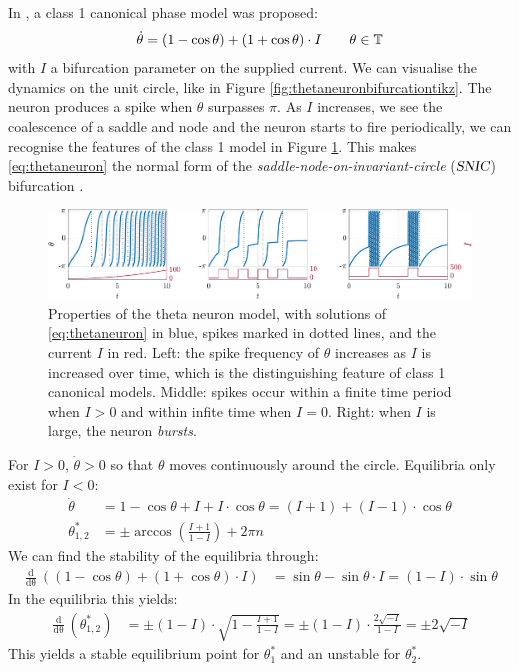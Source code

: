 In \cite{Ermentrout1986}, a class 1 canonical phase model was proposed:
\begin{align}
\dot{\theta} = (1-\cos \theta)+(1+\cos \theta) \cdot I \qquad \theta \in {\mathbb{T}} \label{eq:thetaneuron}
\end{align}
with $I$ a bifurcation parameter on the supplied current. We can visualise the dynamics on the unit circle, like in Figure \ref{fig:thetaneuronbifurcationtikz}. The neuron produces a spike when $\theta$ surpasses $\pi$. As $I$ increases, we see the coalescence of a saddle and node and the neuron starts to fire periodically, we can recognise the features of the class 1 model in Figure \ref{fig:ThetaNeuronResponseToCurrent}. This makes \eqref{eq:thetaneuron} the normal form of the \textit{saddle-node-on-invariant-circle} (${\textsl{SNIC}}$) bifurcation \cite{Luke2013}.

\begin{figure}[H]
\centering
\includegraphics[width = \textwidth]{../Figures/ThetaNeuronResponseToCurrent.pdf}
\caption{Properties of the theta neuron model, with solutions of \eqref{eq:thetaneuron} in blue, spikes marked in dotted lines, and the current $I$ in red. Left: the spike frequency of $\theta$ increases as $I$ is increased over time, which is the distinguishing feature of class 1 canonical models. Middle: spikes occur within a finite time period when $I > 0$ and within infite time when $I = 0$. Right: when $I$ is large, the neuron \textsl{bursts}.}
\label{fig:ThetaNeuronResponseToCurrent}
\end{figure}

For $I > 0$, $\dot{\theta} > 0$ so that $\theta$ moves continuously around the circle. Equilibria only exist for $I < 0$: 
\begin{align*}
\dot{\theta} &= 1-\cos \theta+I+I \cdot \cos \theta = (I+1)+(I-1) \cdot \cos \theta \\
\theta^{\ast}_{1, 2} &= \pm \arccos \left(\frac{I+1}{1-I}\right)+2 \pi n
\end{align*}
We can find the stability of the equilibria through:
\begin{align*}
\frac{\mathop{d}}{\mathop{d \theta}}((1-\cos \theta)+(1+\cos \theta) \cdot I) &= \sin \theta-\sin \theta \cdot I = (1-I) \cdot \sin \theta
\end{align*}
In the equilibria this yields:
\begin{align*}
\frac{\mathop{d}}{\mathop{d \theta}}\left( \theta^{\ast}_{1, 2} \right) &= \pm(1-I) \cdot \sqrt{1-\frac{I+1}{1-I}}=\pm(1-I) \cdot \frac{2 \sqrt{-I}}{1-I} = \pm2 \sqrt{-I}
\end{align*}
This yields a stable equilibrium point for $\theta^{\ast}_{1}$ and an unstable for $\theta^{\ast}_{2}$.

